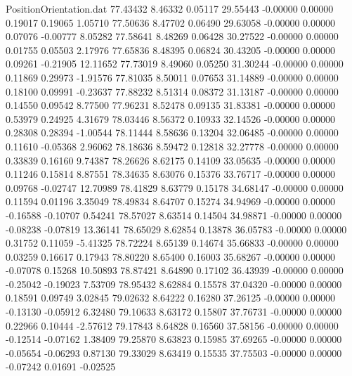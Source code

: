 \begin{filecontents}{PositionOrientation.dat}
  77.43432    8.46332    0.05117    29.55443   -0.00000    0.00000    0.19017    0.19065    1.05710
  77.50636    8.47702    0.06490    29.63058   -0.00000    0.00000    0.07076   -0.00777    8.05282
  77.58641    8.48269    0.06428    30.27522   -0.00000    0.00000    0.01755    0.05503    2.17976
  77.65836    8.48395    0.06824    30.43205   -0.00000    0.00000    0.09261   -0.21905   12.11652
  77.73019    8.49060    0.05250    31.30244   -0.00000    0.00000    0.11869    0.29973   -1.91576
  77.81035    8.50011    0.07653    31.14889   -0.00000    0.00000    0.18100    0.09991   -0.23637
  77.88232    8.51314    0.08372    31.13187   -0.00000    0.00000    0.14550    0.09542    8.77500
  77.96231    8.52478    0.09135    31.83381   -0.00000    0.00000    0.53979    0.24925    4.31679
  78.03446    8.56372    0.10933    32.14526   -0.00000    0.00000    0.28308    0.28394   -1.00544
  78.11444    8.58636    0.13204    32.06485   -0.00000    0.00000    0.11610   -0.05368    2.96062
  78.18636    8.59472    0.12818    32.27778   -0.00000    0.00000    0.33839    0.16160    9.74387
  78.26626    8.62175    0.14109    33.05635   -0.00000    0.00000    0.11246    0.15814    8.87551
  78.34635    8.63076    0.15376    33.76717   -0.00000    0.00000    0.09768   -0.02747   12.70989
  78.41829    8.63779    0.15178    34.68147   -0.00000    0.00000    0.11594    0.01196    3.35049
  78.49834    8.64707    0.15274    34.94969   -0.00000    0.00000   -0.16588   -0.10707    0.54241
  78.57027    8.63514    0.14504    34.98871   -0.00000    0.00000   -0.08238   -0.07819   13.36141
  78.65029    8.62854    0.13878    36.05783   -0.00000    0.00000    0.31752    0.11059   -5.41325
  78.72224    8.65139    0.14674    35.66833   -0.00000    0.00000    0.03259    0.16617    0.17943
  78.80220    8.65400    0.16003    35.68267   -0.00000    0.00000   -0.07078    0.15268   10.50893
  78.87421    8.64890    0.17102    36.43939   -0.00000    0.00000   -0.25042   -0.19023    7.53709
  78.95432    8.62884    0.15578    37.04320   -0.00000    0.00000    0.18591    0.09749    3.02845
  79.02632    8.64222    0.16280    37.26125   -0.00000    0.00000   -0.13130   -0.05912    6.32480
  79.10633    8.63172    0.15807    37.76731   -0.00000    0.00000    0.22966    0.10444   -2.57612
  79.17843    8.64828    0.16560    37.58156   -0.00000    0.00000   -0.12514   -0.07162    1.38409
  79.25870    8.63823    0.15985    37.69265   -0.00000    0.00000   -0.05654   -0.06293    0.87130
  79.33029    8.63419    0.15535    37.75503   -0.00000    0.00000   -0.07242    0.01691   -0.02525

\end{filecontents}
